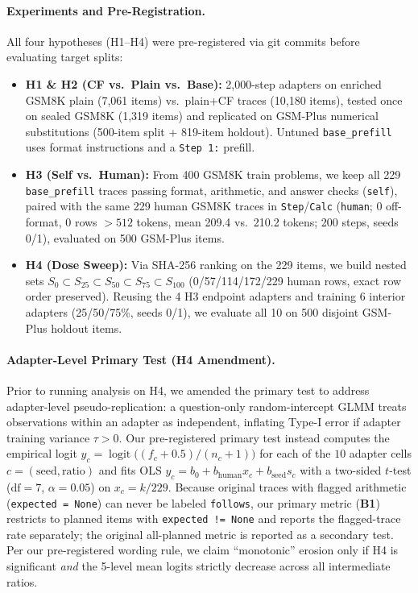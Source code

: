 \documentclass[11pt]{article}
\begin{document}
\paragraph{Experiments and Pre-Registration.}
All four hypotheses (H1--H4) were pre-registered via git commits before evaluating target splits:
\begin{itemize}
    \setlength{\itemsep}{1pt}
    \item \textbf{H1 \& H2 (CF vs.\ Plain vs.\ Base):} 2,000-step adapters on enriched GSM8K plain (7,061 items) vs.\ plain+CF traces (10,180 items), tested once on sealed GSM8K (1,319 items) and replicated on GSM-Plus numerical substitutions (500-item split + 819-item holdout). Untuned \texttt{base\_prefill} uses format instructions and a \texttt{Step 1:} prefill.
    \item \textbf{H3 (Self vs.\ Human):} From 400 GSM8K train problems, we keep all 229 \texttt{base\_prefill} traces passing format, arithmetic, and answer checks (\texttt{self}), paired with the same 229 human GSM8K traces in \texttt{Step}/\texttt{Calc} (\texttt{human}; 0 off-format, 0 rows $>512$ tokens, mean 209.4 vs.\ 210.2 tokens; 200 steps, seeds 0/1), evaluated on 500 GSM-Plus items.
    \item \textbf{H4 (Dose Sweep):} Via SHA-256 ranking on the 229 items, we build nested sets $S_0 \subset S_{25} \subset S_{50} \subset S_{75} \subset S_{100}$ (0/57/114/172/229 human rows, exact row order preserved). Reusing the 4 H3 endpoint adapters and training 6 interior adapters (25/50/75\%, seeds 0/1), we evaluate all 10 on 500 disjoint GSM-Plus holdout items.
\end{itemize}

\paragraph{Adapter-Level Primary Test (H4 Amendment).}
Prior to running analysis on H4, we amended the primary test to address adapter-level pseudo-replication: a question-only random-intercept GLMM treats observations within an adapter as independent, inflating Type-I error if adapter training variance $\tau > 0$.
Our pre-registered primary test instead computes the empirical logit $y_c = \operatorname{logit}\big((f_c + 0.5)/(n_c + 1)\big)$ for each of the $10$ adapter cells $c=(\text{seed}, \text{ratio})$ and fits OLS $y_c = b_0 + b_{\text{human}} x_c + b_{\text{seed}} s_c$ with a two-sided $t$-test ($\text{df}=7$, $\alpha=0.05$) on $x_c = k/229$.
Because original traces with flagged arithmetic (\texttt{expected = None}) can never be labeled \texttt{follows}, our primary metric (\textbf{B1}) restricts to planned items with \texttt{expected != None} and reports the flagged-trace rate separately; the original all-planned metric is reported as a secondary test.
Per our pre-registered wording rule, we claim ``monotonic'' erosion only if H4 is significant \emph{and} the 5-level mean logits strictly decrease across all intermediate ratios.
\end{document}
